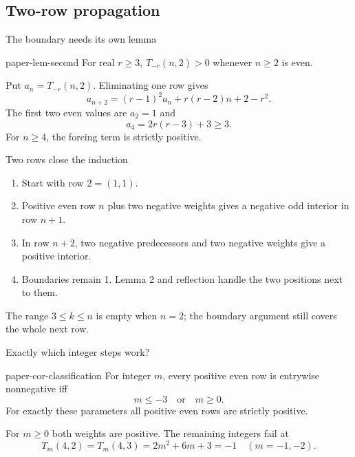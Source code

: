\documentclass{beamer}
\begin{document}
\subsection{Two-row propagation}
\begin{frame}{The boundary needs its own lemma}
\begin{bookresult}{paper-lem-second}
For real $r\geq3$, $T_{-r}(n,2)>0$ whenever $n\geq2$ is even.
\end{bookresult}
Put $a_n=T_{-r}(n,2)$. Eliminating one row gives
\[
a_{n+2}=(r-1)^2a_n+r(r-2)n+2-r^2.
\]
The first two even values are $a_2=1$ and
\[
a_4=2r(r-3)+3\geq3.
\]
For $n\geq4$, the forcing term is strictly positive.
\end{frame}
\begin{frame}{Two rows close the induction}
\begin{enumerate}
\item Start with row $2=(1,1)$.
\item Positive even row $n$ plus two negative weights gives a negative odd interior in row $n+1$.
\item In row $n+2$, two negative predecessors and two negative weights give a positive interior.
\item Boundaries remain 1. Lemma 2 and reflection handle the two positions next to them.
\end{enumerate}
\medskip
The range $3\leq k\leq n$ is empty when $n=2$; the boundary argument still covers the whole next row.
\end{frame}
\begin{frame}{Exactly which integer steps work?}
\begin{bookresult}{paper-cor-classification}
For integer $m$, every positive even row is entrywise nonnegative iff
\[
m\leq-3\quad\text{or}\quad m\geq0.
\]
For exactly these parameters all positive even rows are strictly positive.
\end{bookresult}
For $m\geq0$ both weights are positive. The remaining integers fail at
\[
T_m(4,2)=T_m(4,3)=2m^2+6m+3=-1\quad(m=-1,-2).
\]
\end{frame}
\end{document}
